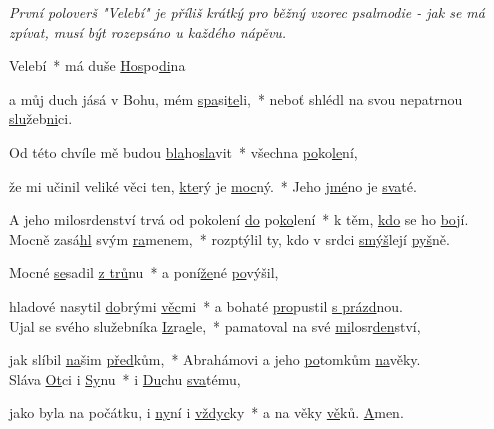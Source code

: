 \documentclass[12pt, a4paper]{article}
\begin{document}
\textit{\tiny{První poloverš "Velebí" je příliš krátký pro běžný vzorec
psalmodie - jak se má zpívat, musí být rozepsáno u každého nápěvu.}}

Velebí~* má duše \underline{Hos}po\underline{di}na 

a můj duch jásá v Bohu, mém \underline{spa}si\underline{te}li,~* neboť shlédl na svou nepatrnou \underline{slu}žeb\underline{ni}ci. 

Od této chvíle mě budou \underline{bla}ho\underline{sla}vit~* všechna \underline{po}ko\underline{le}ní, 

že mi učinil veliké věci ten, \underline{kte}rý je \underline{moc}ný.~* Jeho \underline{jmé}no je \underline{sva}té. 

A jeho milosrdenství trvá od pokolení \underline{do} po\underline{ko}lení~* k těm, \underline{kdo} se ho \underline{bo}jí.\\



Mocně zasá\underline{hl} svým \underline{ra}menem,~* rozptýlil ty, kdo v srdci \underline{smýš}lejí \underline{pyš}ně. 

Mocné \underline{se}sadil \underline{z trů}nu~* a poní\underline{že}né \underline{po}výšil, 

hladové nasytil \underline{do}brými \underline{věc}mi~* a bohaté \underline{pro}pustil \underline{s prázd}nou.\\



Ujal se svého služebníka \underline{Iz}ra\underline{e}le,~* pamatoval na své \underline{mi}losr\underline{den}ství, 

jak slíbil \underline{na}šim \underline{před}kům,~* Abrahámovi a jeho \underline{po}tomkům \underline{na}věky.\\



Sláva \underline{Ot}ci i \underline{Sy}nu~* i \underline{Du}chu \underline{sva}tému, 

jako byla na počátku, i \underline{ny}ní i \underline{vždyc}ky~* a na věky \underline{vě}ků. \underline{A}men.
\end{document}

